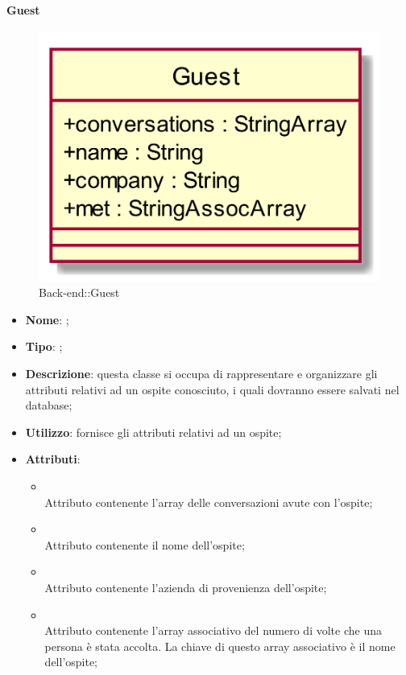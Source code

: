 \hypertarget{Guest_label}{\paragraph{Guest}}
\begin{figure}[h]
	\centering
	\includegraphics[width=\textwidth,height=\textheight,keepaspectratio]{images/ClassGuest.png}
	\caption{Back-end::Guest}
\end{figure}
\begin{itemize}
	\item \textbf{Nome}: ;
	\item \textbf{Tipo}: ;
	\item \textbf{Descrizione}: questa classe si occupa di rappresentare e organizzare gli attributi relativi ad un ospite conosciuto, i quali dovranno essere salvati nel database;
	\item \textbf{Utilizzo}: fornisce gli attributi relativi ad un ospite;
	\item \textbf{Attributi}:
	\begin{itemize}
		\item[]  \\
		Attributo contenente l'array delle conversazioni avute con l'ospite;
		\item[]  \\
		Attributo contenente il nome dell'ospite;
		\item[]  \\
		Attributo contenente l'azienda di provenienza dell'ospite;
		\item[]  \\
		Attributo contenente l'array associativo del numero di volte che una persona è stata accolta. La chiave di questo array associativo è il nome dell'ospite;
	\end{itemize}
\end{itemize}


